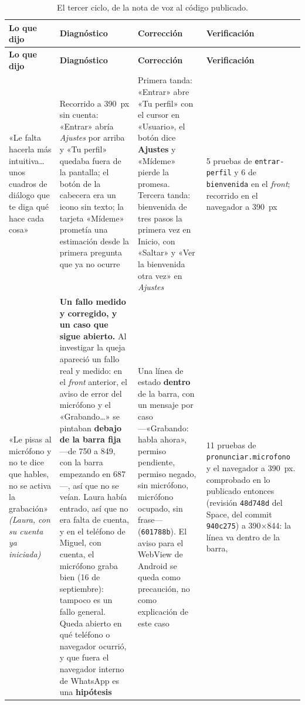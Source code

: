 \documentclass[11pt,a4paper]{article}
\newcommand{\cod}[1]{\texttt{\small #1}}
\begin{document}
\begin{small}
\begin{longtable}{@{}L{3.1cm} L{3.8cm} L{4.2cm} L{2.8cm}@{}}
\toprule
\textbf{Lo que dijo} & \textbf{Diagnóstico} & \textbf{Corrección} & \textbf{Verificación} \\
\midrule
\endfirsthead
\toprule
\textbf{Lo que dijo} & \textbf{Diagnóstico} & \textbf{Corrección} & \textbf{Verificación} \\
\midrule
\endhead
\bottomrule
\endfoot
\bottomrule
\caption{El tercer ciclo, de la nota de voz al código publicado.}
\label{cuad:ismael}
\endlastfoot
«Le falta hacerla más intuitiva\dots{} unos cuadros de diálogo que te diga qué hace cada
cosa» & Recorrido a 390~px sin cuenta: «Entrar» abría \emph{Ajustes} por arriba y «Tu
perfil» quedaba fuera de la pantalla; el botón de la cabecera era un icono sin texto; la
tarjeta «Mídeme» prometía una estimación desde la primera pregunta que ya no ocurre &
Primera tanda: «Entrar» abre «Tu perfil» con el cursor en «Usuario», el botón dice
\textbf{Ajustes} y «Mídeme» pierde la promesa. Tercera tanda: bienvenida de tres pasos la
primera vez en Inicio, con «Saltar» y «Ver la bienvenida otra vez» en \emph{Ajustes} &
5 pruebas de \cod{entrar-perfil} y 6 de \cod{bienvenida} en el \emph{front}; recorrido en
el navegador a 390~px \\
\addlinespace
«Le pisas al micrófono y no te dice que hables, no se activa la grabación»
\emph{(Laura, con su cuenta ya iniciada)} &
\textbf{Un fallo medido y corregido, y un caso que sigue abierto.} Al investigar la queja apareció un fallo
real y medido: en el \emph{front} anterior, el aviso de error del micrófono y el
«Grabando\dots{}» se pintaban \textbf{debajo de la barra fija} ---de 750 a 849, con la
barra empezando en 687---, así que no se veían. Laura había entrado, así que no era falta
de cuenta, y en el teléfono de Miguel, con cuenta, el micrófono graba bien (16 de
septiembre): tampoco es un fallo general. Queda abierto en qué teléfono o navegador
ocurrió, y que fuera el navegador interno de WhatsApp es una \textbf{hipótesis} & Una línea de estado
\textbf{dentro} de la barra, con un mensaje por caso —«Grabando: habla ahora», permiso
pendiente, permiso negado, sin micrófono, micrófono ocupado, sin frase— (\cod{601788b}).
El aviso para el WebView de Android se queda como precaución, no como explicación de este
caso & 11 pruebas de \cod{pronunciar.\allowbreak microfono} y el navegador a 390~px.
comprobado en lo publicado entonces (revisión \cod{48d748d} del Space, del commit \cod{940c275}) a 390$\times$844: la línea va dentro de la barra,

\end{longtable}
\end{small}
\end{document}
